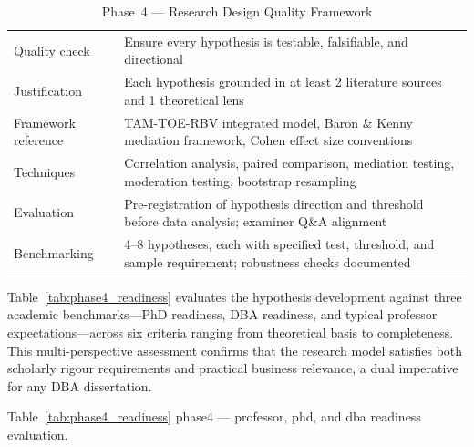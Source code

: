\begin{xltabular}{\textwidth}{@{} l X @{}}
\caption{Phase~4 --- Research Design Quality Framework}
\label{tab:phase4_quality}\\
\toprule
{} &  \\
\midrule
\endfirsthead
\endhead
\bottomrule
\endlastfoot
Quality check        & Ensure every hypothesis is testable, falsifiable, and directional \\
\addlinespace
Justification        & Each hypothesis grounded in at least 2 literature sources and 1 theoretical lens \\
\addlinespace
Framework reference  & TAM-TOE-RBV integrated model, Baron \& Kenny mediation framework, Cohen effect size conventions \\
\addlinespace
Techniques           & Correlation analysis, paired comparison, mediation testing, moderation testing, bootstrap resampling \\
\addlinespace
Evaluation           & Pre-registration of hypothesis direction and threshold before data analysis; examiner Q\&A alignment \\
\addlinespace
Benchmarking         & 4--8 hypotheses, each with specified test, threshold, and sample requirement; robustness checks documented \\
\end{xltabular}
\endgroup

\vspace{1.5em}

Table~\ref{tab:phase4_readiness} evaluates the hypothesis development against three academic benchmarks---PhD readiness, DBA readiness, and typical professor expectations---across six criteria ranging from theoretical basis to completeness. This multi-perspective assessment confirms that the research model satisfies both scholarly rigour requirements and practical business relevance, a dual imperative for any DBA dissertation.

\begingroup\singlespacing\tablefontsize\tablestripes
\noindent Table~\ref{tab:phase4_readiness} phase4 --- professor, phd, and dba readiness evaluation.

